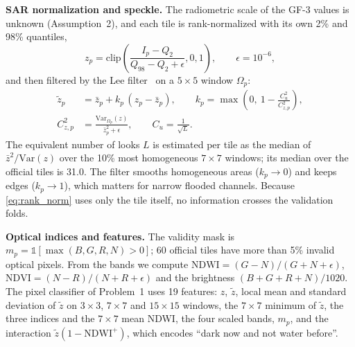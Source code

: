 \textbf{SAR normalization and speckle.} The radiometric scale of the GF-3 values is unknown (Assumption~2), and each tile is rank-normalized with its own 2\% and 98\% quantiles,
\begin{equation}
z_p=\mathrm{clip}\!\left(\frac{I_p-Q_2}{Q_{98}-Q_2+\epsilon},0,1\right),\qquad \epsilon=10^{-6},
\label{eq:rank_norm}
\end{equation}
and then filtered by the Lee filter~\cite{lee1980local} on a $5\times5$ window $\Omega_p$:
\begin{equation}
\begin{split}
\tilde z_p&=\bar z_p+k_p\,(z_p-\bar z_p),\qquad
k_p=\max\!\left(0,\ 1-\frac{C_u^2}{C_{z,p}^2}\right),\\
C_{z,p}^2&=\frac{\mathrm{Var}_{\Omega_p}(z)}{\bar z_p^2+\epsilon},\qquad
C_u=\frac{1}{\sqrt L}.
\end{split}
\label{eq:lee}
\end{equation}
The equivalent number of looks $L$ is estimated per tile as the median of $\bar z^2/\mathrm{Var}(z)$ over the 10\% most homogeneous $7\times7$ windows; its median over the official tiles is 31.0. The filter smooths homogeneous areas ($k_p\to0$) and keeps edges ($k_p\to1$), which matters for narrow flooded channels. Because \eqref{eq:rank_norm} uses only the tile itself, no information crosses the validation folds.

\textbf{Optical indices and features.} The validity mask is $m_p=\mathbb 1[\max(B,G,R,N)>0]$; 60 official tiles have more than 5\% invalid optical pixels. From the bands we compute $\mathrm{NDWI}=(G-N)/(G+N+\epsilon)$, $\mathrm{NDVI}=(N-R)/(N+R+\epsilon)$ and the brightness $(B+G+R+N)/1020$. The pixel classifier of Problem~1 uses 19 features: $z$, $\tilde z$, local mean and standard deviation of $\tilde z$ on $3\times3$, $7\times7$ and $15\times15$ windows, the $7\times7$ minimum of $\tilde z$, the three indices and the $7\times7$ mean NDWI, the four scaled bands, $m_p$, and the interaction $\tilde z(1-\mathrm{NDWI}^+)$, which encodes ``dark now and not water before''\cite{deepseek2026,qwen2026,doubao2026}.
